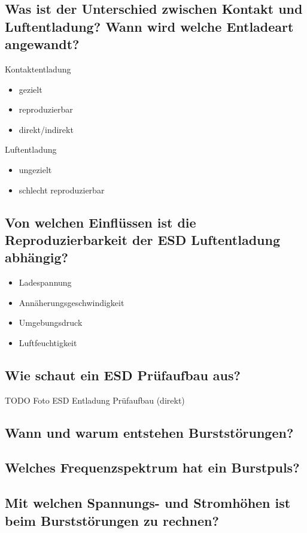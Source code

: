 \subsection{Was ist der Unterschied zwischen Kontakt und Luftentladung? Wann wird welche Entladeart angewandt?}

Kontaktentladung
\begin{itemize}
  \item gezielt
  \item reproduzierbar
  \item direkt/indirekt
\end{itemize}

Luftentladung
\begin{itemize}
  \item ungezielt
  \item schlecht reproduzierbar
\end{itemize}

\subsection{Von welchen Einflüssen ist die Reproduzierbarkeit der ESD Luftentladung abhängig?}
\begin{itemize}
  \item Ladespannung
  \item Annäherungsgeschwindigkeit
  \item Umgebungsdruck
  \item Luftfeuchtigkeit
\end{itemize}

\subsection{Wie schaut ein ESD Prüfaufbau aus?}
TODO Foto ESD Entladung Prüfaufbau (direkt)

\subsection{Wann und warum entstehen Burststörungen?}

\subsection{Welches Frequenzspektrum hat ein Burstpuls?}

\subsection{Mit welchen Spannungs- und Stromhöhen ist beim Burststörungen zu rechnen?}

